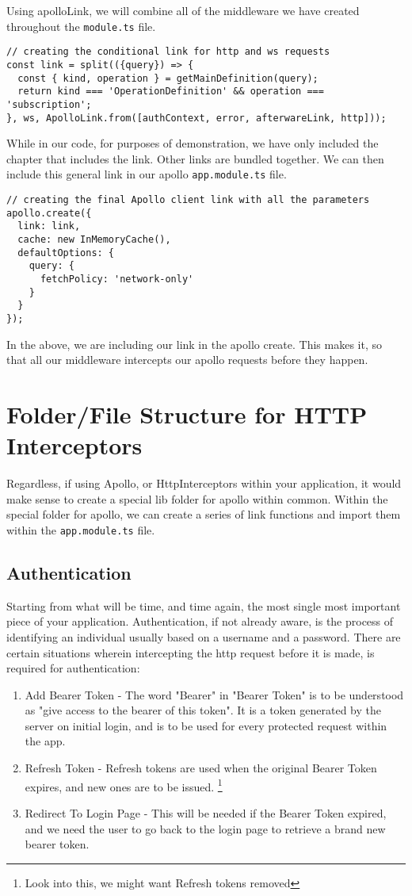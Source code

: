 Using apolloLink, we will combine all of the middleware we have created 
throughout the \lstinline{module.ts} file. 

\begin{lstlisting}
// creating the conditional link for http and ws requests
const link = split(({query}) => {
  const { kind, operation } = getMainDefinition(query);
  return kind === 'OperationDefinition' && operation === 'subscription';
}, ws, ApolloLink.from([authContext, error, afterwareLink, http]));
\end{lstlisting}

While in our code, for purposes of demonstration, we have only included the
chapter that includes the link. Other links are bundled together. We can 
then include this general link in our apollo \lstinline{app.module.ts} file.

\begin{lstlisting}
// creating the final Apollo client link with all the parameters
apollo.create({
  link: link,
  cache: new InMemoryCache(),
  defaultOptions: {
    query: {
      fetchPolicy: 'network-only'
    }
  }
});
\end{lstlisting}

In the above, we are including our link in the apollo create. This makes it, so
that all our middleware intercepts our apollo requests before they happen. 

\section{Folder/File Structure for HTTP Interceptors}
Regardless, if using Apollo, or HttpInterceptors within your application, it 
would make sense to create a special lib folder for apollo within common. 
Within the special folder for apollo, we can create a series of link functions
and import them within the \lstinline{app.module.ts} file.

\subsection{ Authentication }
Starting from what will be time, and time again, the most single most important
piece of your application. Authentication, if not already aware, is the process 
of identifying an individual usually based on a username and a password. There
are certain situations wherein intercepting the http request before it is made,
is required for authentication:
\begin{enumerate}
\item Add Bearer Token - The word "Bearer" in "Bearer Token" is to be 
understood as "give access to the bearer of this token". It is a token 
generated by the server on initial login, and is to be used for every protected
request within the app. 
\item Refresh Token - Refresh tokens are used when the original Bearer Token
expires, and new ones are to be issued.
\footnote{Look into this, we might want Refresh tokens removed} 
\item Redirect To Login Page - This will be needed if the Bearer Token expired,
and we need the user to go back to the login page to retrieve a brand new 
bearer token. 
\end{enumerate}

